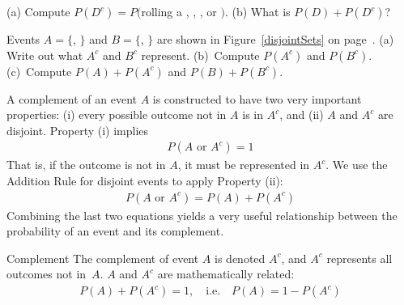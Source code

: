 \begin{exercisewrap}
\begin{nexercise}
(a) Compute $P(D^c) = P($rolling a , , , or $)$. (b) What is $P(D) + P(D^c)$?\footnotemark
\end{nexercise}
\end{exercisewrap}

\begin{exercisewrap}
\begin{nexercise}
Events $A=\{$, $\}$ and $B=\{$, $\}$ are shown in Figure~\ref{disjointSets} on page~\pageref{disjointSets}. (a) Write out what $A^c$ and $B^c$ represent. (b)~Compute $P(A^c)$ and $P(B^c)$. (c)~Compute $P(A)+P(A^c)$ and $P(B)+P(B^c)$.\footnotemark
\end{nexercise}
\end{exercisewrap}

A complement of an event $A$ is constructed to have two very important properties: (i) every possible outcome not in $A$ is in $A^c$, and (ii) $A$ and $A^c$ are disjoint. Property (i) implies
\begin{align*}
P(A\text{ or }A^c) = 1
\end{align*}
That is, if the outcome is not in $A$, it must be represented in $A^c$. We use the Addition Rule for disjoint events to apply Property (ii):
\begin{align*}
P(A\text{ or }A^c) = P(A) + P(A^c)
\end{align*}
Combining the last two equations yields a very useful
relationship between the probability of an event and
its complement.

\begin{onebox}{Complement}
  The complement of event $A$ is denoted $A^c$, and $A^c$
  represents all outcomes not in~$A$. $A$ and $A^c$ are
  mathematically related:
  \begin{align*}
  P(A) + P(A^c) = 1, \quad\text{i.e.}\quad P(A) = 1-P(A^c)
  \end{align*}
\end{onebox}

